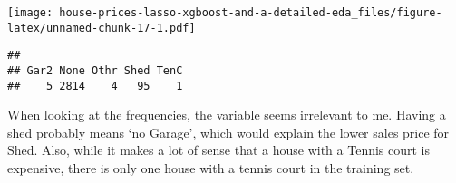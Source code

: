 \documentclass[]{article}
\newenvironment{Shaded}{\begin{snugshade}}{\end{snugshade}}
\newcommand{\DataTypeTok}[1]{\textcolor[rgb]{0.13,0.29,0.53}{#1}}
\newcommand{\DecValTok}[1]{\textcolor[rgb]{0.00,0.00,0.81}{#1}}
\newcommand{\KeywordTok}[1]{\textcolor[rgb]{0.13,0.29,0.53}{\textbf{#1}}}
\newcommand{\NormalTok}[1]{#1}
\newcommand{\OperatorTok}[1]{\textcolor[rgb]{0.81,0.36,0.00}{\textbf{#1}}}
\newcommand{\StringTok}[1]{\textcolor[rgb]{0.31,0.60,0.02}{#1}}
\begin{document}
\begin{Shaded}
\end{Shaded}

\texttt{[image: house-prices-lasso-xgboost-and-a-detailed-eda\_files/figure-latex/unnamed-chunk-17-1.pdf]}

\begin{Shaded}
\end{Shaded}

\begin{verbatim}
## 
## Gar2 None Othr Shed TenC 
##    5 2814    4   95    1
\end{verbatim}

When looking at the frequencies, the variable seems irrelevant to me.
Having a shed probably means `no Garage', which would explain the lower
sales price for Shed. Also, while it makes a lot of sense that a house
with a Tennis court is expensive, there is only one house with a tennis
court in the training set.
\end{document}
